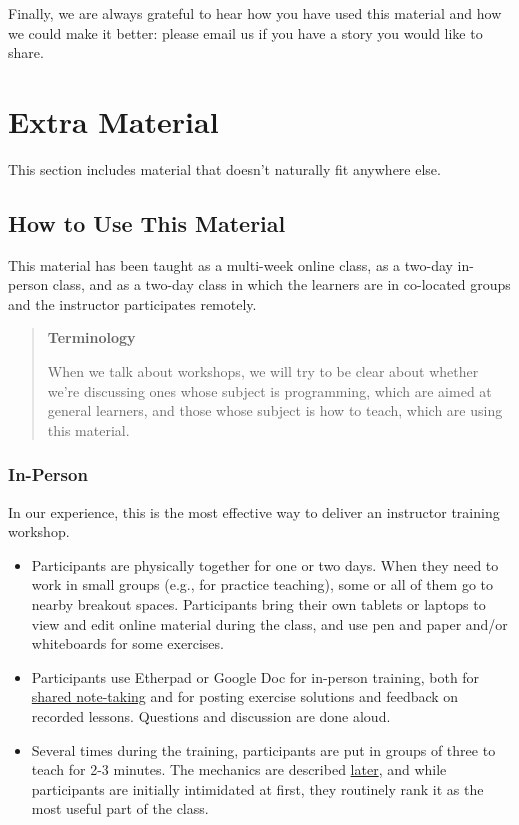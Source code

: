 \documentclass[10pt,statementpaper]{memoir}
\begin{document}
Finally, we are always grateful to hear how you have used this material
and how we could make it better: please email us if you have a story you
would like to share.

\chapter{Extra Material}\label{extra-material}

This section includes material that doesn't naturally fit anywhere else.

\section{How to Use This Material}\label{how-to-use-this-material}

This material has been taught as a multi-week online class, as a two-day
in-person class, and as a two-day class in which the learners are in
co-located groups and the instructor participates remotely.

\begin{quote}
\textbf{Terminology}

When we talk about workshops, we will try to be clear about whether
we're discussing ones whose subject is programming, which are aimed at
general learners, and those whose subject is how to teach, which are
using this material.
\end{quote}

\subsection{In-Person}\label{in-person}

In our experience, this is the most effective way to deliver an
instructor training workshop.

\begin{itemize}
\item
  Participants are physically together for one or two days. When they
  need to work in small groups (e.g., for practice teaching), some or
  all of them go to nearby breakout spaces. Participants bring their own
  tablets or laptops to view and edit online material during the class,
  and use pen and paper and/or whiteboards for some exercises.
\item
  Participants use Etherpad or Google Doc for in-person training, both
  for \href{practices.html\#take-notes-together}{shared note-taking} and
  for posting exercise solutions and feedback on recorded lessons.
  Questions and discussion are done aloud.
\item
  Several times during the training, participants are put in groups of
  three to teach for 2-3 minutes. The mechanics are described
  \href{performance.html\#how-to-practice-teaching}{later}, and while
  participants are initially intimidated at first, they routinely rank
  it as the most useful part of the class.
\end{itemize}
\end{document}
